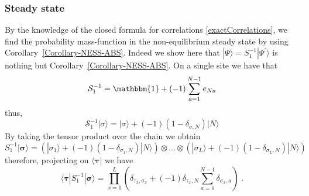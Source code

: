 \documentclass[10pt]{article}
\numberwithin{equation}{section}
\numberwithin{equation}{subsection}
\newcommand{\dt}{\;.}
\begin{document}
\subsubsection{Steady state}\label{appB}
By the knowledge of the closed formula for correlations \eqref{exactCorrelations}, we find the probability mass-function in the non-equilibrium steady state by using Corollary~\ref{Corollary-NESS-ABS}. Indeed we show here that 
$|\Psi\rangle=S_{1}^{-1}|\Psi^{'}\rangle$ is nothing but Corollary~\ref{Corollary-NESS-ABS}.
On a single site we have that 
\begin{equation}\label{S1-L1}
	\mathcal{S}_{1}^{-1}=\mathbbm{1}+(-1)\sum_{a=1}^{N-1}e_{Na}
\end{equation}
thus,
\begin{equation}
	\mathcal{S}_{1}^{-1}|\sigma\rangle=|\sigma\rangle+(-1)(1-\delta_{\sigma,N})|N\rangle
\end{equation}
By taking the tensor product over the chain we obtain 
\begin{equation}
	S_{1}^{-1}|\bm{\sigma}\rangle=\left(|\sigma_{1}\rangle+(-1)(1-\delta_{\sigma_{1},N})|N\rangle\right)\otimes \ldots \otimes \left(|\sigma_{L}\rangle+(-1)(1-\delta_{\sigma_{L},N})|N\rangle\right)
\end{equation}
therefore, projecting on $\langle \bm{\tau}|$ we have
\begin{equation}\label{Tensor-S1}
	\langle \bm{\tau}|	S_{1}^{-1}|\bm{\sigma}\rangle=\prod_{x=1}^{L}\left(\delta_{\tau_{x},\sigma_{x}}+(-1)\delta_{\tau_{x},N}\sum_{a=1}^{N-1}\delta_{\sigma_{x},a}\right)\dt
\end{equation}
\end{document}
